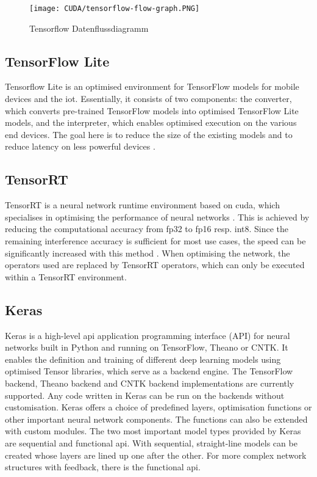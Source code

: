 \begin{figure}[htb]
	\centering
	\texttt{[image: CUDA/tensorflow-flow-graph.PNG]}
	\caption[Tensorflow Datenflussdiagramm]{Tensorflow Datenflussdiagramm \cite{Abadi:2016}}
	\label{fig:tensorflow-flow}
\end{figure}



\subsection{TensorFlow Lite}

Tensorflow Lite is an optimised environment for TensorFlow models for mobile devices and the \ac{iot}. Essentially, it consists of two components: the converter, which converts pre-trained TensorFlow models into optimised TensorFlow Lite models, and the interpreter, which enables optimised execution on the various end devices. The goal here is to reduce the size of the existing models and to reduce latency on less powerful devices \cite{GoogleTensorFlowLiteGuide:2020}.

\subsection{TensorRT}\label{sec:tensorrt}

TensorRT is a neural network runtime environment based on \ac{cuda}, which specialises in optimising the performance of neural networks \cite{TensorRT:2015}. This is achieved by reducing the computational accuracy from \ac{fp32} to \ac{fp16} resp. \ac{int8}. Since the remaining interference accuracy is sufficient for most use cases, the speed can be significantly increased with this method \cite{Gysel:2016}. When optimising the network, the operators used are replaced by TensorRT operators, which can only be executed within a TensorRT environment.


\subsection{Keras}

Keras is a high-level \ac{api} application programming interface (API) for neural networks built in Python and running on TensorFlow, Theano or CNTK. It enables the definition and training of different deep learning models using optimised Tensor libraries, which serve as a backend engine. The TensorFlow backend, Theano backend and CNTK backend implementations are currently supported. 
Any code written in Keras can be run on the backends without customisation. Keras offers a choice of predefined layers, optimisation functions or other important neural network components. The functions can also be extended with custom modules. The two most important model types provided by Keras are sequential and functional api. With sequential, straight-line models can be created whose layers are lined up one after the other. For more complex network structures with feedback, there is the functional api. \cite{Chollet:2018,Keras:2020}

